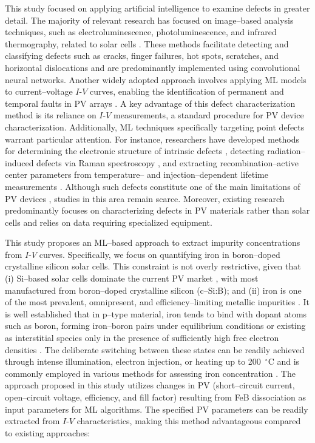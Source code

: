 \documentclass[a4paper,fleqn]{cas-sc}
\begin{document}
This study focused on applying artificial intelligence to examine defects in greater detail. 
The majority of relevant research has focused on image--based analysis techniques, such as electroluminescence, photoluminescence, and infrared thermography, related to solar cells \cite{AlOtum2024, Pratt2021, Li2024a, Lin2021, Tang2020, Bu2022, Turek2023, Huang2022}. 
These methods facilitate detecting and classifying defects such as cracks, finger failures, hot spots, scratches, and horizontal dislocations and are predominantly implemented using convolutional neural networks. 
Another widely adopted approach involves applying ML models to current--voltage $I$-$V$ curves, enabling the identification of permanent and temporal faults in PV arrays \cite{Liu2021, Chen2019, Hopwood2020, Mellit2021}. 
A key advantage of this defect characterization method is its reliance on $I$-$V$ measurements, a standard procedure for PV device characterization. 
Additionally, ML techniques specifically targeting point defects warrant particular attention.
For instance, researchers have developed methods for determining the electronic structure of intrinsic defects \cite{Ma2025, Choudhary2023}, detecting radiation--induced defects via Raman spectroscopy \cite{Chia2024, Park2022}, and extracting recombination--active center parameters from temperature-- and injection--dependent lifetime measurements \cite{Wang2024a, Buratti2022, Buratti2020a}.
Although such defects constitute one of the main limitations of PV devices \cite{Le2024, Yamaguchi2018}, studies in this area remain scarce. 
Moreover, existing research predominantly focuses on characterizing defects in PV materials rather than solar cells and relies on data requiring specialized equipment.


This study proposes an ML--based approach to extract impurity concentrations from $I$-$V$ curves. 
Specifically, we focus on quantifying iron in boron--doped crystalline silicon solar cells. 
This constraint is not overly restrictive, given that 
(i) Si--based solar cells dominate the current PV market \cite{Bosnjakovic2024, Zhang2021}, with most manufactured from boron--doped crystalline silicon (c--Si:B); 
and (ii) iron is one of the most prevalent, omnipresent, and efficiency--limiting metallic impurities \cite{Buonassisi2006, IronSC}. 
It is well established that in p--type material, iron tends to bind with dopant atoms such as boron, forming iron–boron pairs under equilibrium conditions or existing as interstitial species only in the presence of sufficiently high free electron densities \cite{Kimerling1983, FeBAssJAP2014}. 
The deliberate switching between these states can be readily achieved through intense illumination, electron injection, or heating up to 200~$^\circ$C and is commonly employed in various methods for assessing iron concentration \cite{Zoth1990, Rein2, Schmidt2005, Goodarzi2017, Olikh2021JAP, FeMethod2012, Herguth2022, Macdonald2004}. 
The approach proposed in this study utilizes changes in PV (short--circuit current, open--circuit voltage, efficiency, and fill factor) resulting from FeB dissociation as input parameters for ML algorithms. 
The specified PV parameters can be readily extracted from $I$-$V$ characteristics, making this method advantageous compared to existing approaches:
\end{document}
